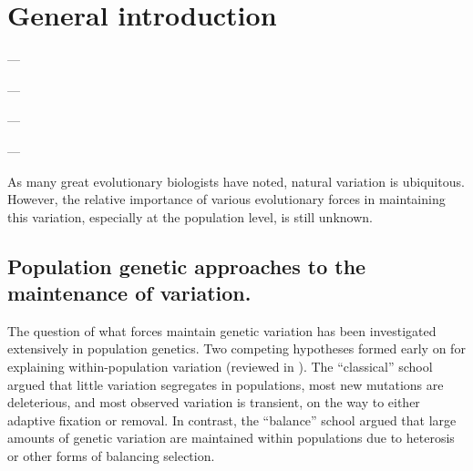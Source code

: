 
\setlength{\parindent}{0ex}
\setlength{\parskip}{0ex}

\chapter{General introduction}

\begin{flushright}
--- \citet{darwin1859}
\end{flushright}

\begin{flushright}
--- \citet{haldane1932}
\end{flushright}

\begin{flushright}
--- \citet{dob1937}
\end{flushright}

\begin{flushright}
--- \citet{Lewontin1966-kz}
\end{flushright}

As many great evolutionary biologists have noted, natural variation is ubiquitous. However, the relative importance of various evolutionary forces in maintaining this variation, especially at the population level, is still unknown. 

\setlength{\parskip}{2ex}

\section{Population genetic approaches to the maintenance of variation.}

The question of what forces maintain genetic variation has been investigated extensively in population genetics. Two competing hypotheses formed early on for explaining within-population variation (reviewed in \citealt{lewontin1974}). The “classical” school argued that little variation segregates in populations, most new mutations are deleterious, and most observed variation is transient, on the way to either adaptive fixation or removal. In contrast, the “balance” school argued that large amounts of genetic variation are maintained within populations due to heterosis or other forms of balancing selection. 


